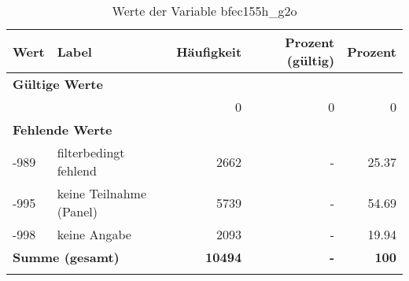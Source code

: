      \begin{longtable}{Xlrrr}
     \toprule
     \textbf{Wert} & \textbf{Label} & \textbf{Häufigkeit} & \textbf{Prozent (gültig)} & \textbf{Prozent} \\
     \endhead
     \midrule
     \multicolumn{5}{l}{\textbf{Gültige Werte}}\\
      & & 0 & 0 & 0 \\
     \midrule
     \multicolumn{5}{l}{\textbf{Fehlende Werte}}\\
       -989 & filterbedingt fehlend & \num{2662} & - & \num[round-mode=places,round-precision=2]{25.37} \\

       -995 & keine Teilnahme (Panel) & \num{5739} & - & \num[round-mode=places,round-precision=2]{54.69} \\

       -998 & keine Angabe & \num{2093} & - & \num[round-mode=places,round-precision=2]{19.94} \\

     \midrule
     \multicolumn{2}{l}{\textbf{Summe (gesamt)}} & \textbf{\num{10494}} & \textbf{-} & \textbf{\num{100}} \\
     \bottomrule
     \caption{Werte der Variable bfec155h\_g2o}
     \end{longtable}
     
